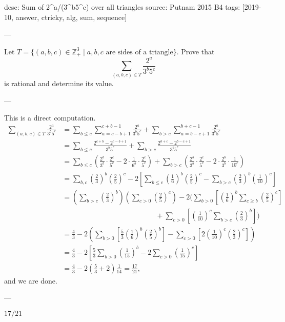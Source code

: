 desc: Sum of 2^a/(3^b5^c) over all triangles
source: Putnam 2015 B4
tags: [2019-10, answer, ctricky, alg, sum, sequence]

---

Let $T=\{(a,b,c)\in\mathbb Z_+^3\mid a,b,c\text{ are sides of a triangle}\}$. Prove that \[\sum_{(a,b,c)\in T}\frac{2^a}{3^b5^c}\]
is rational and determine its value.

---

This is a direct computation.
\begin{align*}
    \sum_{(a,b,c)\in T}\frac{2^a}{3^b5^c}&=\sum_{b\le c}\sum_{a=c-b+1}^{c+b-1}\frac{2^a}{3^b5^c}+\sum_{b>c}\sum_{a=b-c+1}^{b+c-1}\frac{2^a}{3^b5^c}\\
    &=\sum_{b\le c}\frac{2^{c+b}-2^{c-b+1}}{3^b5^c}+\sum_{b>c}\frac{2^{b+c}-2^{b-c+1}}{3^b5^c}\\
    &=\sum_{b\le c}\left(\frac{2^b}{3^b}\cdot\frac{2^c}{5^c}-2\cdot\frac1{6^b}\cdot\frac{2^c}{5^c}\right)+\sum_{b>c}\left(\frac{2^b}{3^b}\cdot\frac{2^c}{5^c}-2\cdot\frac{2^b}{3^b}\cdot\frac1{10^c}\right)\\
    &=\sum_{b,c}\left(\frac23\right)^b\left(\frac25\right)^c-2\left[\sum_{b\le c}\left(\frac16\right)^b\left(\frac25\right)^c-\sum_{b>c}\left(\frac23\right)^b\left(\frac1{10}\right)^c\right]\\
    &=\left(\sum_{b>c}\left(\frac23\right)^b\right)\left(\sum_{c>0}\left(\frac25\right)^c\right)-2\Bigg(\sum_{b>0}\left[\left(\frac16\right)^b\sum_{c\ge b}\left(\frac25\right)^c\right]\\
    &\hspace{13em}+\sum_{c>0}\left[\left(\frac1{10}\right)^c\sum_{b>c}\left(\frac23\right)^b\right]\Bigg)\\
    &=\frac43-2\left(\sum_{b>0}\left[\frac53\left(\frac16\right)^b\left(\frac25\right)^b\right]-\sum_{c>0}\left[2\left(\frac1{10}\right)^c\left(\frac23\right)^c\right]\right)\\
    &=\frac43-2\left[\frac53\sum_{b>0}\left(\frac1{15}\right)^b-2\sum_{c>0}\left(\frac1{15}\right)^c\right]\\
    &=\frac43-2\left(\frac53+2\right)\frac1{14}=\frac{17}{21},
\end{align*}
and we are done.

---

$17/21$
